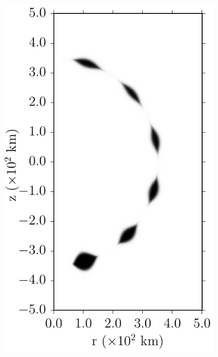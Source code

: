 \documentclass[iop,apj]{emulateapj}
\begin{document}
\begin{figure}[ht]
\begin{minipage}{0.24\textwidth}
    \includegraphics[width=\linewidth]{figures/cf_initcond_rhoddt-7.2/profile75_mpole-12_r-35e6_a-24e5_init.pdf}
  \end{minipage} \hfill 
  \begin{minipage}{0.24\textwidth}

\end{minipage}
\end{figure}
\end{document}
